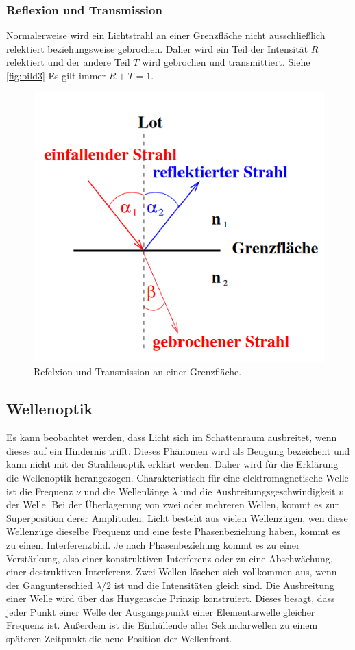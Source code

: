 \subsubsection{Reflexion und Transmission}
\label{sec:Reflexion und Transmission}
Normalerweise wird ein Lichtstrahl an einer Grenzfläche nicht ausschließlich relektiert beziehungsweise gebrochen.
Daher wird ein Teil der Intensität $R$ relektiert und der andere Teil $T$ wird gebrochen und transmittiert. Siehe \autoref{fig:bild3} 
Es gilt immer $R + T = 1$.

\begin{figure}[H]
    \centering
	\includegraphics[width=0.6\linewidth]{content/grafik/trans.png}
	\caption{Refelxion und Transmission an einer Grenzfläche. \cite{reflex}}
	\label{fig:bild3}
\end{figure}

\subsection{Wellenoptik}
\label{sec:Wellenoptik}
Es kann beobachtet werden, dass Licht sich im Schattenraum ausbreitet, wenn dieses auf ein Hindernis trifft.
Dieses Phänomen wird als Beugung bezeichent und kann nicht mit der Strahlenoptik erklärt werden.  Daher wird 
für die Erklärung die Wellenoptik herangezogen. Charakteristisch für eine elektromagnetische Welle ist die Frequenz $\nu$
und die Wellenlänge $\lambda $ und die Ausbreitungsgeschwindigkeit $v$ der Welle. Bei der Überlagerung von zwei oder mehreren Wellen, 
kommt es zur Superposition derer Amplituden. Licht besteht aus vielen Wellenzügen, wen diese Wellenzüge dieselbe Frequenz und eine
feste Phasenbeziehung haben, kommt es zu einem Interferenzbild. Je nach Phasenbeziehung kommt es zu einer Verstärkung, also 
einer konstruktiven Interferenz oder zu eine Abschwächung, einer destruktiven Interferenz. Zwei Wellen löschen sich vollkommen aus,
wenn der Gangunterschied $\lambda/2$ ist und die Intensitäten gleich sind. Die Ausbreitung einer Welle wird über das Huygensche
Prinzip konstruiert. Dieses besagt, dass jeder Punkt einer Welle  der Ausgangspunkt einer Elementarwelle gleicher Frequenz ist.
Außerdem ist die Einhüllende aller Sekundarwellen zu einem späteren Zeitpunkt die neue Position der Wellenfront.

